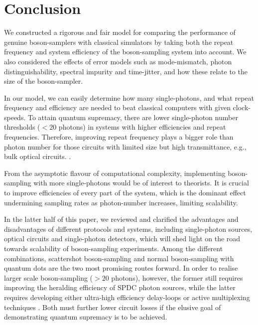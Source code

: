 \documentclass[aps,rmp,twocolumn,amsmath,amssymb,nofootinbib,superscriptaddress]{revtex4}
\newcommand{\comment}[1]{{\color{blue}{#1}}}
\begin{document}
\section{Conclusion} \label{sec:conclusion}

We constructed a rigorous and fair model for comparing the performance of genuine boson-samplers with classical simulators by taking both the repeat frequency and system efficiency of the boson-sampling system into account. We also considered the effects of error models such as mode-mismatch, photon distinguishability, spectral impurity and time-jitter, and how these relate to the size of the boson-sampler.

In our model, we can easily determine how many single-photons, and what repeat frequency and efficiency are needed to beat classical computers with given clock-speeds. To attain quantum supremacy, there are lower single-photon number thresholds ($<20$ photons) in systems with higher efficiencies and repeat frequencies. Therefore, improving repeat frequency plays a bigger role than photon number for those circuits with limited size but high transmittance, e.g., bulk optical circuits. \comment{Don't quite understand this last sentence}.

From the asymptotic flavour of computational complexity, implementing boson-sampling with more single-photons would be of interest to theorists. It is crucial to improve efficiencies of every part of the system, which is the dominant effect undermining sampling rates as photon-number increases, limiting scalability.

In the latter half of this paper, we reviewed and clarified the advantages and disadvantages of different protocols and systems, including single-photon sources, optical circuits and single-photon detectors, which will shed light on the road towards scalability of boson-sampling experiments. Among the different combinations, scattershot boson-sampling and normal boson-sampling with quantum dots are the two most promising routes forward. In order to realise larger scale boson-sampling ($>20$ photons), however, the former still requires improving the heralding efficiency of SPDC photon sources, while the latter requires developing either ultra-high efficiency delay-loops or active multiplexing techniques \cite{bib:89}. Both must further lower circuit losses if the elusive goal of demonstrating quantum supremacy is to be achieved.
\end{document}
